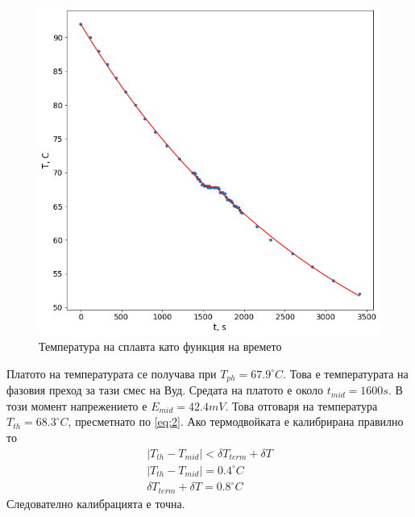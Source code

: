 \documentclass[aps, prb, twocolumn, a4paper, floatfix, reprint]{revtex4-2}
\begin{document}
\begin{figure}[H]
    \centering
    \caption{Температура на сплавта като функция на времето}
    \includegraphics[width=0.95\columnwidth, keepaspectratio=true]{cool3.png}
\end{figure}
Платото на температурата се получава при $T_{ph} = 67.9^{\circ}C$. Това е температурата на фазовия преход за тази смес на Вуд. Средата на платото е около $t_{mid}=1600s$. В този момент напрежението е $E_{mid} = 42.4 mV$. Това отговаря на температура $T_{th} = 68.3^{\circ} C$, пресметнато по \eqref{eq:2}. Ако термодвойката е калибрирана правилно то 
\begin{gather*}
    \vert T_{th} - T_{mid} \vert < \delta T_{term} + \delta T \\
    \vert T_{th} - T_{mid} \vert = 0.4^{\circ}C \\
    \delta T_{term} + \delta T = 0.8^{\circ}C 
\end{gather*}
Следователно калибрацията е точна. 
\end{document}
